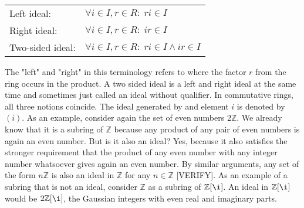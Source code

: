 \medskip
\begin{tabular}{l l}
Left ideal:      & $\forall i \in I, r \in R: \; r i \in I$  \\
Right ideal:     & $\forall i \in I, r \in R: \; i r \in I$  \\
Two-sided ideal: & $\forall i \in I, r \in R: \; r i \in I \wedge i r \in I$  \\
\end{tabular}
\medskip

The "left" and "right" in this terminology refers to where the factor $r$ from the ring occurs in the product. A two sided ideal is a left and right ideal at the same time and sometimes just called an ideal without qualifier. In commutative rings, all three notions coincide. The ideal generated by and element $i$ is denoted by $(i)$. As an example, consider again the set of even numbers $2 \mathbb{Z}$. We already know that it is a subring of $\mathbb{Z}$ because any product of any pair of even numbers is again an even number. But is it also an ideal? Yes, because it also satisfies the stronger requirement that the product of any even number with any integer number whatsoever gives again an even number. By similar arguments, any set of the form $n \mathbb{Z}$ is also an ideal in $\mathbb{Z}$ for any $n \in \mathbb{Z}$ [VERIFY]. As an example of a subring that is not an ideal, consider $\mathbb{Z}$ as a subring of $\mathbb{Z}[\i]$. An ideal in $\mathbb{Z}[\i]$ would be $2\mathbb{Z}[\i]$, the Gaussian integers with even real and imaginary parts.







